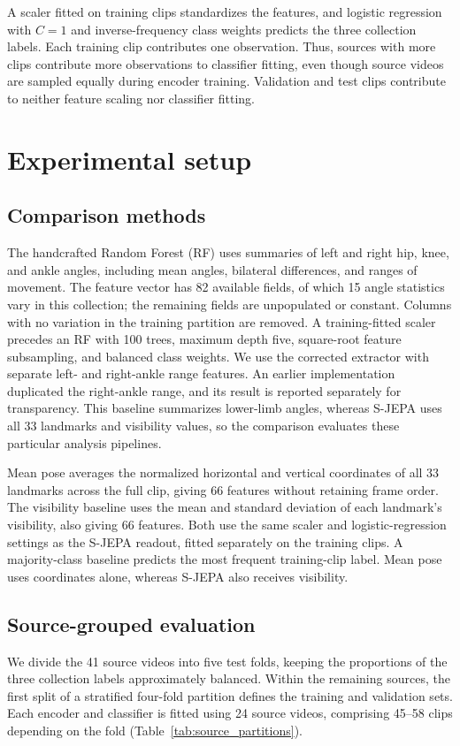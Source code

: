 \documentclass[10pt,twocolumn,letterpaper]{article}
\begin{document}
A scaler fitted on training clips standardizes the features, and logistic regression with $C=1$ and inverse-frequency class weights predicts the three collection labels. Each training clip contributes one observation. Thus, sources with more clips contribute more observations to classifier fitting, even though source videos are sampled equally during encoder training. Validation and test clips contribute to neither feature scaling nor classifier fitting.


\section{Experimental setup}
\subsection{Comparison methods}
The handcrafted Random Forest (RF) uses summaries of left and right hip, knee, and ankle angles, including mean angles, bilateral differences, and ranges of movement. The feature vector has 82 available fields, of which 15 angle statistics vary in this collection; the remaining fields are unpopulated or constant. Columns with no variation in the training partition are removed. A training-fitted scaler precedes an RF with 100 trees, maximum depth five, square-root feature subsampling, and balanced class weights. We use the corrected extractor with separate left- and right-ankle range features. An earlier implementation duplicated the right-ankle range, and its result is reported separately for transparency. This baseline summarizes lower-limb angles, whereas S-JEPA uses all 33 landmarks and visibility values, so the comparison evaluates these particular analysis pipelines.


Mean pose averages the normalized horizontal and vertical coordinates of all 33 landmarks across the full clip, giving 66 features without retaining frame order. The visibility baseline uses the mean and standard deviation of each landmark's visibility, also giving 66 features. Both use the same scaler and logistic-regression settings as the S-JEPA readout, fitted separately on the training clips. A majority-class baseline predicts the most frequent training-clip label. Mean pose uses coordinates alone, whereas S-JEPA also receives visibility.

\subsection{Source-grouped evaluation}
We divide the 41 source videos into five test folds, keeping the proportions of the three collection labels approximately balanced. Within the remaining sources, the first split of a stratified four-fold partition defines the training and validation sets. Each encoder and classifier is fitted using 24 source videos, comprising 45--58 clips depending on the fold (Table~\ref{tab:source_partitions}).
\end{document}
